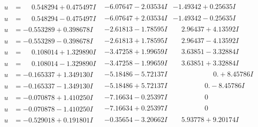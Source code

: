 \documentclass[1p]{elsarticle_modified}
\theoremstyle{definition}
\begin{document}
$$\begin{array}{c|c|c}
\begin{aligned}
u &= \phantom{-}0.548294 + 0.475497 I\end{aligned}
 & -6.07647 - 2.03534 I & -1.49342 + 0.25635 I \\ \hline\begin{aligned}
u &= \phantom{-}0.548294 - 0.475497 I\end{aligned}
 & -6.07647 + 2.03534 I & -1.49342 - 0.25635 I \\ \hline\begin{aligned}
u &= -0.553289 + 0.398678 I\end{aligned}
 & -2.61813 - 1.78595 I & \phantom{-}2.96437 + 4.13592 I \\ \hline\begin{aligned}
u &= -0.553289 - 0.398678 I\end{aligned}
 & -2.61813 + 1.78595 I & \phantom{-}2.96437 - 4.13592 I \\ \hline\begin{aligned}
u &= \phantom{-}0.108014 + 1.329890 I\end{aligned}
 & -3.47258 + 1.99659 I & \phantom{-}3.63851 - 3.32884 I \\ \hline\begin{aligned}
u &= \phantom{-}0.108014 - 1.329890 I\end{aligned}
 & -3.47258 - 1.99659 I & \phantom{-}3.63851 + 3.32884 I \\ \hline\begin{aligned}
u &= -0.165337 + 1.349130 I\end{aligned}
 & -5.18486 - 5.72137 I & \phantom{-0.000000 -}0. + 8.45786 I \\ \hline\begin{aligned}
u &= -0.165337 - 1.349130 I\end{aligned}
 & -5.18486 + 5.72137 I & \phantom{-0.000000 } 0. - 8.45786 I \\ \hline\begin{aligned}
u &= -0.070878 + 1.410250 I\end{aligned}
 & -7.16634 - 0.25397 I & \phantom{-0.000000 } 0 \\ \hline\begin{aligned}
u &= -0.070878 - 1.410250 I\end{aligned}
 & -7.16634 + 0.25397 I & \phantom{-0.000000 } 0 \\ \hline\begin{aligned}
u &= -0.529018 + 0.191801 I\end{aligned}
 & -0.35654 - 3.20662 I & \phantom{-}5.93778 + 9.20174 I \\ \hline\begin{aligned}

\end{aligned}
\end{array}$$
\end{document}
